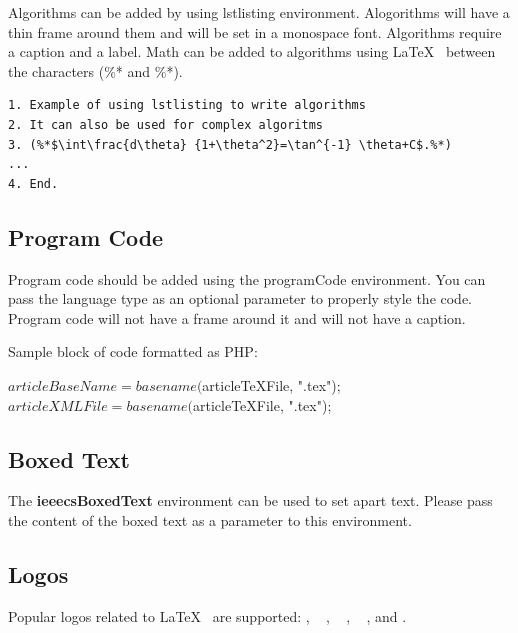 \documentclass{csmagazine}
\begin{document}
Algorithms can be added by using lstlisting environment. Alogorithms will have a thin frame around them and will be set in a monospace font. Algorithms require a caption and a label. Math can be added to algorithms using \LaTeX~ between the characters (\%* and \%*).



\begin{lstlisting}[caption={Add a caption for your algorithm here.}, label=Algorithm1]
1. Example of using lstlisting to write algorithms
2. It can also be used for complex algoritms
3. (%*$\int\frac{d\theta} {1+\theta^2}=\tan^{-1} \theta+C$.%*)
...
4. End. 
\end{lstlisting}

\subsection{Program Code}

Program code should be added using the programCode environment. You can pass the language type as an optional parameter to properly style the code. Program code will not have a frame around it and will not have a caption.

Sample block of code formatted as PHP:

\begin{programCode}
[language=PhP]
$articleBaseName = basename($articleTeXFile, ".tex");
$articleXMLFile = basename($articleTeXFile, ".tex");
\end{programCode}


\subsection{Boxed Text}


\begin{ieeecsBoxedText}{The \textbf{ieeecsBoxedText} environment can be used to set apart text. Please pass the content of the boxed text as a parameter to this environment.}
\end{ieeecsBoxedText}


\subsection{Logos}

Popular logos related to \LaTeX~ are supported: \AllTeX, ~ \BibLaTeX, ~ \XeLaTeX, ~ , and .
\end{document}
